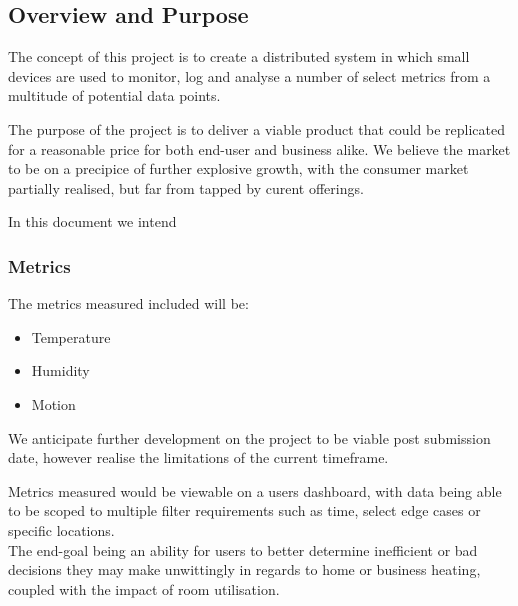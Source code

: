 \documentclass{article}
\begin{document}
        \subsection{Overview and Purpose}
            The concept of this project is to create a distributed system in which small 
            devices are used to monitor, log and analyse a number of select metrics from a 
            multitude of potential data points.
            \par\noindent
            The purpose of the project is to deliver a viable product that could be replicated
            for a reasonable price for both end-user and business alike. We believe the market to
            be on a precipice of further explosive growth, with the consumer market partially
            realised, but far from tapped by curent offerings.
            \par\noindent
            In this document we intend 
            \subsubsection{Metrics}
                The metrics measured included will be: 
                \begin{itemize}
                    \item Temperature
                    \item Humidity
                    \item Motion
                \end{itemize}
                We anticipate further development on the project to be viable post submission date,
                however realise the limitations of the current timeframe.
                \par
                Metrics measured would be viewable on a users dashboard, with data being able to be
                scoped to multiple filter requirements such as time, select edge cases or specific 
                locations.
                \\
                The end-goal being an ability for users to better determine inefficient or bad decisions
                they may make unwittingly in regards to home or business heating, coupled with the 
                impact of room utilisation.

    \newpage
\end{document}
